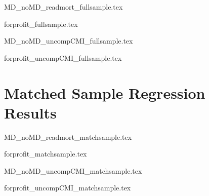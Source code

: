 \documentclass[12pt]{article}
\begin{document}
{MD_noMD_readmort_fullsample.tex}

{forprofit_fullsample.tex}

{MD_noMD_uncompCMI_fullsample.tex}

{forprofit_uncompCMI_fullsample.tex}

\section{Matched Sample Regression Results}

{MD_noMD_readmort_matchsample.tex}

{forprofit_matchsample.tex}

{MD_noMD_uncompCMI_matchsample.tex}

{forprofit_uncompCMI_matchsample.tex}



    

    

    

    

    

    

	
	
	
\end{document}
